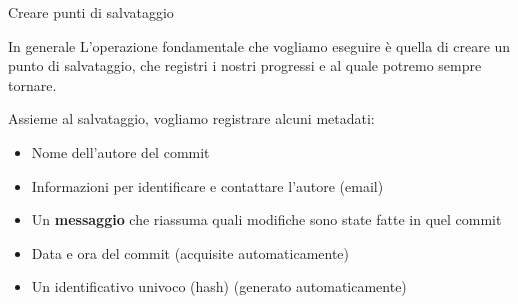 \documentclass[xcolor=dvipsnames,presentation]{beamer}
\begin{document}
\begin{frame}{Creare punti di salvataggio}
    \begin{block}{In generale}
        L'operazione fondamentale che vogliamo eseguire è quella di creare un punto di salvataggio,
che registri i nostri progressi e al quale potremo sempre tornare.

        Assieme al salvataggio, vogliamo registrare alcuni metadati:
        \begin{itemize}
            \item Nome dell'autore del commit
            \item Informazioni per identificare e contattare l'autore (email)
            \item Un \textbf{messaggio} che riassuma quali modifiche sono state fatte in quel commit
            \item Data e ora del commit (acquisite automaticamente)
            \item Un identificativo univoco (hash) (generato automaticamente)
        \end{itemize}


\end{block}
\end{frame}
\end{document}
